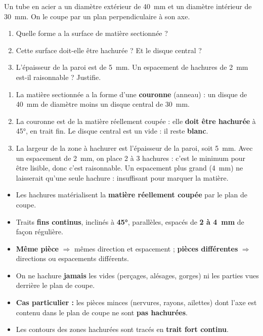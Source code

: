 \documentclass[11pt]{article}
\begin{document}
\begin{exercice}
Un tube en acier a un diamètre extérieur de \SI{40}{mm} et un diamètre intérieur de \SI{30}{mm}. On le coupe par un plan perpendiculaire à son axe.
\begin{enumerate}
\item Quelle forme a la surface de matière sectionnée ?
\item Cette surface doit-elle être hachurée ? Et le disque central ?
\item L'épaisseur de la paroi est de \SI{5}{mm}. Un espacement de hachures de \SI{2}{mm} est-il raisonnable ? Justifie.
\end{enumerate}
\end{exercice}

\begin{corrige}
\begin{enumerate}
\item La matière sectionnée a la forme d'une \textbf{couronne} (anneau) : un disque de \SI{40}{mm} de diamètre moins un disque central de \SI{30}{mm}.
\item La couronne est de la matière réellement coupée : elle \textbf{doit être hachurée} à \ang{45}, en trait fin. Le disque central est un vide : il reste \textbf{blanc}.
\item La largeur de la zone à hachurer est l'épaisseur de la paroi, soit \SI{5}{mm}. Avec un espacement de \SI{2}{mm}, on place 2 à 3 hachures : c'est le minimum pour être lisible, donc c'est raisonnable. Un espacement plus grand (\SI{4}{mm}) ne laisserait qu'une seule hachure : insuffisant pour marquer la matière.
\end{enumerate}
\end{corrige}

\begin{aretenir}
\begin{itemize}
\item Les hachures matérialisent la \textbf{matière réellement coupée} par le plan de coupe.
\item Traits \textbf{fins continus}, inclinés à \textbf{\ang{45}}, parallèles, espacés de \textbf{2 à \SI{4}{mm}} de façon régulière.
\item \textbf{Même pièce} $\Rightarrow$ mêmes direction et espacement ; \textbf{pièces différentes} $\Rightarrow$ directions ou espacements différents.
\item On ne hachure \textbf{jamais} les vides (perçages, alésages, gorges) ni les parties vues derrière le plan de coupe.
\item \textbf{Cas particulier :} les pièces minces (nervures, rayons, ailettes) dont l'axe est contenu dans le plan de coupe ne sont \textbf{pas hachurées}.
\item Les contours des zones hachurées sont tracés en \textbf{trait fort continu}.
\end{itemize}
\end{aretenir}
\end{document}
